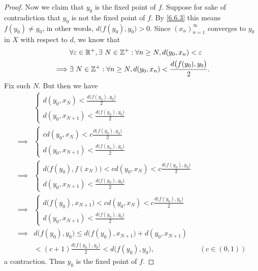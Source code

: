 \begin{proof}
  Now we claim that \(y_0\) is the fixed point of \(f\).
  Suppose for sake of contradiction that \(y_0\) is not the fixed point of \(f\).
  By \cref{6.6.3} this means \(f(y_0) \neq y_0\), in other words, \(d\big(f(y_0), y_0\big) > 0\).
  Since \((x_n)_{n = 1}^\infty\) converges to \(y_0\) in \(X\) with respect to \(d\), we know that
  \begin{align*}
             & \forall \varepsilon \in \mathbb{R}^+, \exists\ N \in \mathbb{Z}^+ : \forall n \geq N, d(y_0, x_n) < \varepsilon \\
    \implies & \exists\ N \in \mathbb{Z}^+ : \forall n \geq N, d(y_0, x_n) < \frac{d\big(f(y_0), y_0\big)}{2}.
  \end{align*}
  Fix such \(N\).
  But then we have
  \begin{align*}
             & \begin{cases}
                 d(y_0, x_N) < \frac{d\big(f(y_0), y_0\big)}{2} \\
                 d(y_0, x_{N + 1}) < \frac{d\big(f(y_0), y_0\big)}{2}
               \end{cases}                                                   \\
    \implies & \begin{cases}
                 c d(y_0, x_N) < c \frac{d\big(f(y_0), y_0\big)}{2} \\
                 d(y_0, x_{N + 1}) < \frac{d\big(f(y_0), y_0\big)}{2}
               \end{cases}                                                   \\
    \implies & \begin{cases}
                 d\big(f(y_0), f(x_N)\big) < c d(y_0, x_N) < c \frac{d\big(f(y_0), y_0\big)}{2} \\
                 d(y_0, x_{N + 1}) < \frac{d\big(f(y_0), y_0\big)}{2}
               \end{cases}                        \\
    \implies & \begin{cases}
                 d\big(f(y_0), x_{N + 1}\big) < c d(y_0, x_N) < c \frac{d\big(f(y_0), y_0\big)}{2} \\
                 d(y_0, x_{N + 1}) < \frac{d\big(f(y_0), y_0\big)}{2}
               \end{cases}                     \\
    \implies & d\big(f(y_0), y_0\big) \leq d\big(f(y_0), x_{N + 1}\big) + d(y_0, x_{N + 1})                          \\
             & < (c + 1) \frac{d\big(f(y_0), y_0\big)}{2} < d\big(f(y_0), y_0\big),                 & (c \in (0, 1))
  \end{align*}
  a contraction.
  Thus \(y_0\) is the fixed point of \(f\).
\end{proof}

